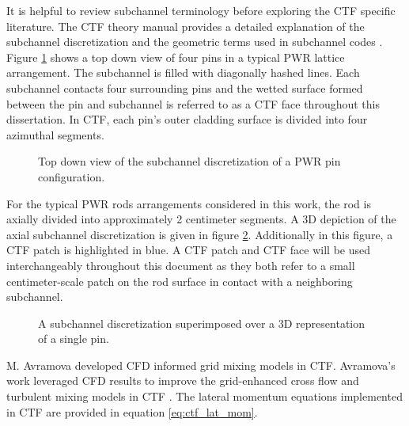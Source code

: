 It is helpful to review subchannel terminology before exploring the CTF specific literature.  The CTF theory manual provides a detailed explanation of the subchannel discretization and the geometric terms used in subchannel codes \cite{salko12}.  Figure \ref{fig:ctf_subchannel} shows a top down view of four pins in a typical PWR lattice arrangement.  The subchannel is filled with diagonally hashed lines.  Each subchannel contacts four surrounding pins and the wetted surface formed between the pin and subchannel is referred to as a CTF face throughout this dissertation.  In CTF, each pin's outer cladding surface is divided into four azimuthal segments.

\begin{figure}
	\centering
	
	\caption{Top down view of the subchannel discretization of a PWR pin configuration.}
	\label{fig:ctf_subchannel}
\end{figure}

For the typical PWR rods arrangements considered in this work, the rod is axially divided into approximately 2 centimeter segments.  A 3D depiction of the axial subchannel discretization is given in figure \ref{fig:ctf_axial_dis}.  Additionally in this figure, a CTF patch is highlighted in blue.  A CTF patch and CTF face will be used interchangeably throughout this document as they both refer to a small centimeter-scale patch on the rod surface in contact with a neighboring subchannel.

\begin{figure}
	\centering
		
	\caption{A subchannel discretization superimposed over a 3D representation of a single pin.}
	\label{fig:ctf_axial_dis}
\end{figure}

 M. Avramova developed CFD informed grid mixing models in CTF.  Avramova's work leveraged CFD results to improve the grid-enhanced cross flow and turbulent mixing models in CTF \cite{avramova2007}.  The lateral momentum equations implemented in CTF are provided in equation \ref{eq:ctf_lat_mom}.

